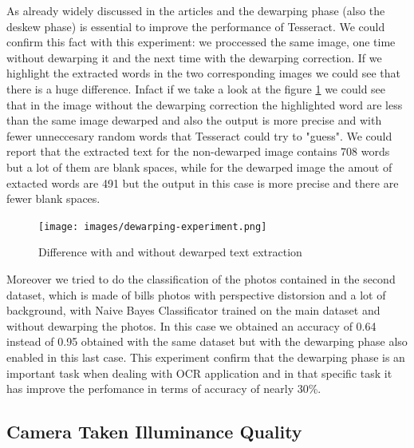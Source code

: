 \documentclass[10pt,twocolumn,letterpaper]{article}
\begin{document}
As already widely discussed in the articles
\cite{Improvingcamera-based} and \cite{recoveringhomography} the
dewarping phase (also the deskew phase) is essential to improve the
performance of Tesseract. We could confirm this fact with this
experiment: we proccessed the same image, one time without dewarping
it and the next time with the dewarping correction. If we highlight
the extracted words in the two corresponding images we could see that
there is a huge difference. Infact if we take a look at the figure
\ref{dewarping-experiment} we could see that in the image without the
dewarping correction the highlighted word are less than the same image
dewarped and also the output is more precise and with fewer
unneccesary random words that Tesseract could try to "guess". We could
report that the extracted text for the non-dewarped image contains 708
words but a lot of them are blank spaces, while for the dewarped image
the amout of extacted words are 491 but the output in this case is
more precise and there are fewer blank spaces.

\begin{figure}[b]
  \centering
  \texttt{[image: images/dewarping-experiment.png]}
  \caption{Difference with and without dewarped text extraction}
  \label{dewarping-experiment}
\end{figure}

Moreover we tried to do the classification of the photos contained in
the second dataset, which is made of bills photos with perspective
distorsion and a lot of background, with Naive Bayes Classificator
trained on the main dataset and without dewarping the photos. In this
case we obtained an accuracy of 0.64 instead of 0.95 obtained with the
same dataset but with the dewarping phase also enabled in this last
case. This experiment confirm that the dewarping phase is an important
task when dealing with OCR application and in that specific task it
has improve the perfomance in terms of accuracy of nearly 30\%.

\subsection{Camera Taken Illuminance Quality}
\end{document}
